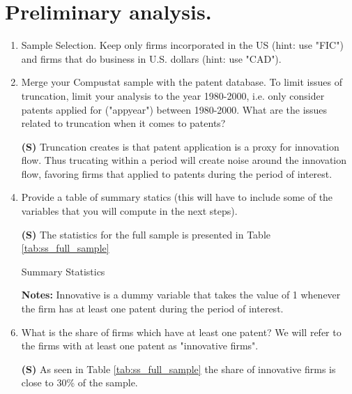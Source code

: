 \documentclass[12pt]{article}
\begin{document}
\section{Preliminary analysis.}

\begin{enumerate}[leftmargin=0pt, label=\textbf{(\alph*)}]

\item Sample Selection. Keep only firms incorporated in the US (hint: use "FIC") and firms that do business in U.S. dollars (hint: use "CAD").

\item Merge your Compustat sample with the patent database. To limit issues of truncation, limit your analysis to the year 1980-2000, i.e. only consider patents applied for ("appyear") between 1980-2000. What are the issues related to truncation when it comes to patents?
\item[\textbf{(S)}] Truncation creates is that patent application is a proxy for innovation flow. Thus trucating within a period will create noise around the innovation flow, favoring firms that applied to patents during the period of interest. 

\item Provide a table of summary statics (this will have to include some of the variables that you will compute in the next steps).
\item[\textbf{(S)}] The statistics for the full sample is presented in Table \ref{tab:ss_full_sample}
\begin{table}[htb]
\caption{Summary Statistics}
\label{tab:ss_full_sample}

\scriptsize{\textbf{Notes:} Innovative is a dummy variable that takes the value of 1 whenever the firm has at least one patent during the period of interest. }
\end{table}
\FloatBarrier

\item What is the share of firms which have at least one patent? We will refer to the firms with at least one patent as "innovative firms".
\item[\textbf{(S)}] As seen in Table \ref{tab:ss_full_sample} the share of innovative firms is close to 30\% of the sample. 


\end{enumerate}
\end{document}
